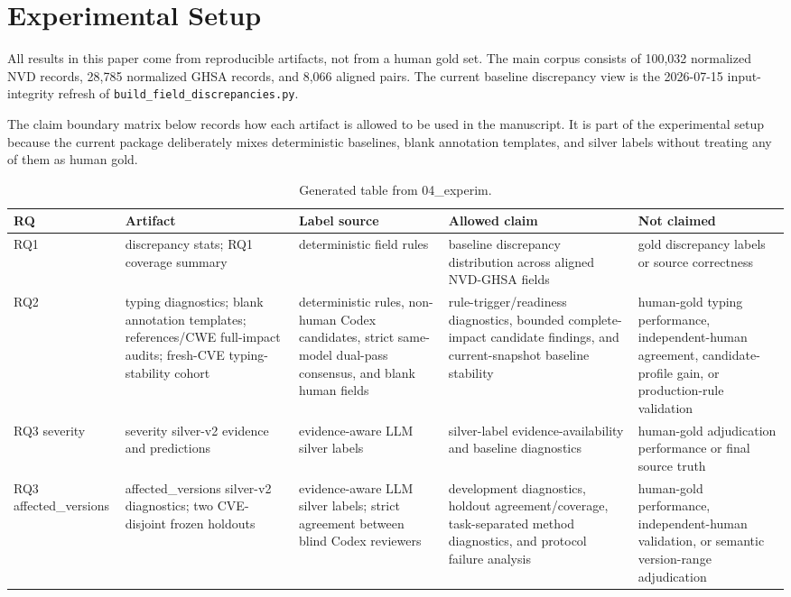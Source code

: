 \section{Experimental Setup}

All results in this paper come from reproducible artifacts, not from a human gold set. The main corpus consists of 100,032 normalized NVD records, 28,785 normalized GHSA records, and 8,066 aligned pairs. The current baseline discrepancy view is the 2026-07-15 input-integrity refresh of \texttt{build\_field\_discrepancies.py}.

The claim boundary matrix below records how each artifact is allowed to be used in the manuscript. It is part of the experimental setup because the current package deliberately mixes deterministic baselines, blank annotation templates, and silver labels without treating any of them as human gold.

\begin{table}[!htbp]
\centering
\setlength{\tabcolsep}{3pt}
\scriptsize
\caption{Generated table from 04\_experim.}
\label{tab:04-experim-table-1}
\begin{tabularx}{\textwidth}{>{\raggedright\arraybackslash}p{}>{\raggedright\arraybackslash}X>{\raggedright\arraybackslash}X>{\raggedright\arraybackslash}X>{\raggedright\arraybackslash}X}
\toprule
RQ & Artifact & Label source & Allowed claim & Not claimed \\
\midrule
RQ1 & discrepancy stats; RQ1 coverage summary & deterministic field rules & baseline discrepancy distribution across aligned NVD-GHSA fields & gold discrepancy labels or source correctness \\
RQ2 & typing diagnostics; blank annotation templates; references/CWE full-impact audits; fresh-CVE typing-stability cohort & deterministic rules, non-human Codex candidates, strict same-model dual-pass consensus, and blank human fields & rule-trigger/readiness diagnostics, bounded complete-impact candidate findings, and current-snapshot baseline stability & human-gold typing performance, independent-human agreement, candidate-profile gain, or production-rule validation \\
RQ3 severity & severity silver-v2 evidence and predictions & evidence-aware LLM silver labels & silver-label evidence-availability and baseline diagnostics & human-gold adjudication performance or final source truth \\
RQ3 affected\_versions & affected\_versions silver-v2 diagnostics; two CVE-disjoint frozen holdouts & evidence-aware LLM silver labels; strict agreement between blind Codex reviewers & development diagnostics, holdout agreement/coverage, task-separated method diagnostics, and protocol failure analysis & human-gold performance, independent-human validation, or semantic version-range adjudication \\
\bottomrule
\end{tabularx}
\end{table}

